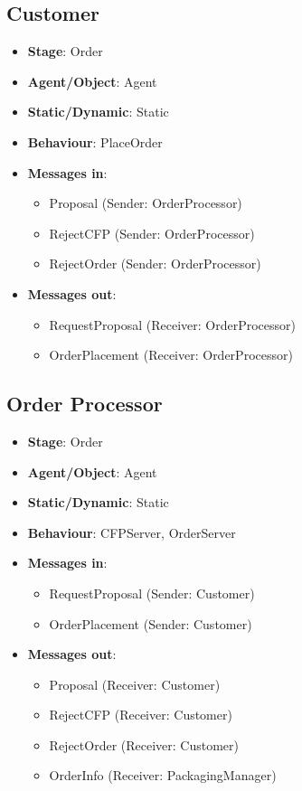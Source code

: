 \documentclass[12pt]{article}
\begin{document}
\subsection{Customer}%
\label{sub:customer_agent}
\begin{itemize}
    \item \textbf{Stage}: Order
    \item \textbf{Agent/Object}: Agent
    \item \textbf{Static/Dynamic}: Static
    \item \textbf{Behaviour}: PlaceOrder
    \item \textbf{Messages in}:
        \begin{itemize}
            \item Proposal (Sender: OrderProcessor)
            \item RejectCFP (Sender: OrderProcessor)
            \item RejectOrder (Sender: OrderProcessor)
        \end{itemize}
    \item \textbf{Messages out}:
        \begin{itemize}
            \item RequestProposal (Receiver: OrderProcessor)
            \item OrderPlacement (Receiver: OrderProcessor)
        \end{itemize}
\end{itemize}

\subsection{Order Processor}%
\label{sub:order_processor}
\begin{itemize}
    \item \textbf{Stage}: Order
    \item \textbf{Agent/Object}: Agent
    \item \textbf{Static/Dynamic}: Static
    \item \textbf{Behaviour}: CFPServer, OrderServer
    \item \textbf{Messages in}:
        \begin{itemize}
            \item RequestProposal (Sender: Customer)
            \item OrderPlacement (Sender: Customer)
        \end{itemize}
    \item \textbf{Messages out}:
        \begin{itemize}
            \item Proposal (Receiver: Customer)
            \item RejectCFP (Receiver: Customer)
            \item RejectOrder (Receiver: Customer)
            \item OrderInfo (Receiver: PackagingManager)
        \end{itemize}
\end{itemize}
\end{document}
